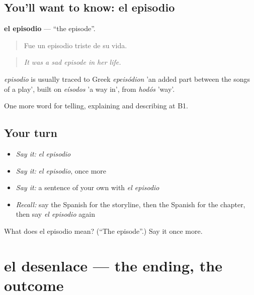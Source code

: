 \subsection*{You'll want to know: el episodio}
\textbf{el episodio} — \textquotedblleft{}the episode\textquotedblright{}.

\begin{quote}
Fue un episodio triste de su vida.
\end{quote}

\begin{quote}
\emph{It was a sad episode in her life.}
\end{quote}

\begin{cousinweb}
\emph{episodio} is usually traced to Greek \emph{epeisódion} 'an added part between the songs of a play', built on \emph{eísodos} 'a way in', from \emph{hodós} 'way'.
\end{cousinweb}

\begin{grammarlens}[title={What you've built}]
One more word for telling, explaining and describing at B1.
\end{grammarlens}

\subsection*{Your turn}
\begin{itemize}
\raggedright
  \item \emph{Say it:} \emph{el episodio}
  \item \emph{Say it:} \emph{el episodio}, once more
  \item \emph{Say it:} a sentence of your own with \emph{el episodio}
  \item \emph{Recall:} say the Spanish for the storyline, then the Spanish for the chapter, then say \emph{el episodio} again
\end{itemize}

\begin{tcolorbox}[breakable,colback=teal!4,colframe=teal!35!black,title={Before you move on}]
What does el episodio mean? (\textquotedblleft{}The episode\textquotedblright{}.) Say it once more.
\end{tcolorbox}
\section[el desenlace]{el desenlace — the ending, the outcome}

